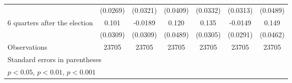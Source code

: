 \begin{table}[!ht]
\begin{tabular}{l*{6}{c}}
                    &    (0.0269)         &    (0.0321)         &    (0.0409)         &    (0.0332)         &    (0.0313)         &    (0.0489)         \\
[1em]
 6 quarters after the election&       0.101\sym{**} &     -0.0189         &       0.120\sym{*}  &       0.135\sym{***}&     -0.0149         &       0.149\sym{**} \\
                    &    (0.0309)         &    (0.0309)         &    (0.0489)         &    (0.0305)         &    (0.0291)         &    (0.0462)         \\
\hline
Observations        &       23705         &       23705         &       23705         &       23705         &       23705         &       23705         \\
\hline\hline
\multicolumn{7}{l}{\footnotesize Standard errors in parentheses}\\
\multicolumn{7}{l}{\footnotesize \sym{*} \(p<0.05\), \sym{**} \(p<0.01\), \sym{***} \(p<0.001\)}\\
\end{tabular}
\end{table}
